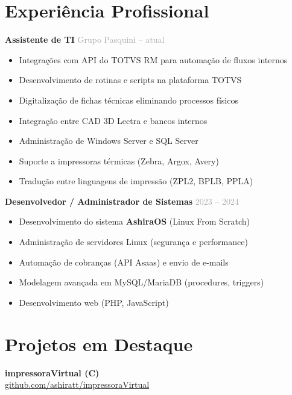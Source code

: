 \documentclass[11pt,a4paper]{article}
\begin{document}
\section{Experiência Profissional}

\textbf{Assistente de TI} \hfill {\small\textcolor{darkgray}{Grupo Pasquini -- atual}}

\begin{itemize}
    \item Integrações com API do TOTVS RM para automação de fluxos internos
    \item Desenvolvimento de rotinas e scripts na plataforma TOTVS
    \item Digitalização de fichas técnicas eliminando processos físicos
    \item Integração entre CAD 3D Lectra e bancos internos
    \item Administração de Windows Server e SQL Server
    \item Suporte a impressoras térmicas (Zebra, Argox, Avery)
    \item Tradução entre linguagens de impressão (ZPL2, BPLB, PPLA)
\end{itemize}

\vspace{4pt}

\textbf{Desenvolvedor / Administrador de Sistemas} \hfill {\small\textcolor{darkgray}{2023 -- 2024}}

\begin{itemize}
    \item Desenvolvimento do sistema \textbf{AshiraOS} (Linux From Scratch)
    \item Administração de servidores Linux (segurança e performance)
    \item Automação de cobranças (API Asaas) e envio de e-mails
    \item Modelagem avançada em MySQL/MariaDB (procedures, triggers)
    \item Desenvolvimento web (PHP, JavaScript)
\end{itemize}

\section{Projetos em Destaque}

\textbf{impressoraVirtual (C)}\\
\href{https://github.com/ashiratt/impressoraVirtual}{github.com/ashiratt/impressoraVirtual}
\end{document}
